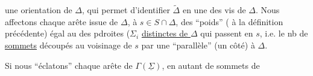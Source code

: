  une orientation de $\Delta$, qui permet d'identifier $\widetilde\Delta$ en une des vis de $\Delta$. Nous affectons chaque arête  issue de $\Delta$,  à  $s\in S\cap\Delta$, des ``poids'' ( à la définition précédente) égal au   des pdroites ($\Sigma_i$  \deleted{$\unsure{\Delta}$} \uline{distinctes de $\Delta$} qui passent en $s$, i.e. le nb de \uline{sommets} découpés au voisinage de $s$ par une ``parallèle'' (un côté) à $\Delta$.


Si nous ``éclatons'' chaque arête de $\Gamma(\underline\Sigma)$, en autant de sommets de
